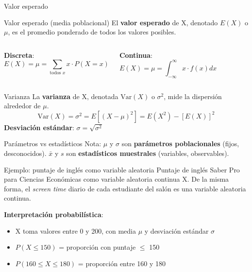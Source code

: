 \documentclass[aspectratio=169, 11pt]{beamer}
\begin{document}
\begin{frame}{Valor esperado}
\begin{block}{Valor esperado (media poblacional)}
El \textbf{valor esperado} de X, denotado $E(X)$ o $\mu$, es el promedio ponderado de todos los valores posibles.
\end{block}

\begin{columns}[T]
\textbf{Discreta}:
\[
E(X) = \mu = \sum_{\text{todos } x} x \cdot P(X=x)
\]

\textbf{Continua}:
\[
E(X) = \mu = \int_{-\infty}^{\infty} x \cdot f(x) dx
\]
\end{columns}

\vspace{1em}
\begin{block}{Varianza}
La \textbf{varianza} de X, denotada $\text{Var}(X)$ o $\sigma^2$, mide la dispersión alrededor de $\mu$.
\[
\text{Var}(X) = \sigma^2 = E[(X - \mu)^2] = E(X^2) - [E(X)]^2
\]
\textbf{Desviación estándar}: $\sigma = \sqrt{\sigma^2}$
\end{block}
\end{frame}

\begin{frame}{Par\'ametros vs estad\'isticos}
\alert{Nota}: $\mu$ y $\sigma$ son \textbf{par\'ametros poblacionales} (fijos, desconocidos). $\bar{x}$ y $s$ son \textbf{estad\'isticos muestrales} (variables, observables).

\vspace{0.5em}
\begin{exampleblock}{Ejemplo: puntaje de ingl\'es como variable aleatoria}
Puntaje de ingl\'es Saber Pro para Ciencias Econ\'omicas como variable aleatoria continua X. De la misma forma, el \emph{screen time} diario de cada estudiante del sal\'on es una variable aleatoria continua.
\end{exampleblock}

\textbf{Interpretaci\'on probabil\'istica}:
\begin{itemize}
\item X toma valores entre 0 y 200, con media $\mu$ y desviaci\'on est\'andar $\sigma$
\item $P(X \leq 150)$ = proporci\'on con puntaje $\leq$ 150
\item $P(160 \leq X \leq 180)$ = proporci\'on entre 160 y 180
\end{itemize}
\end{frame}
\end{document}

